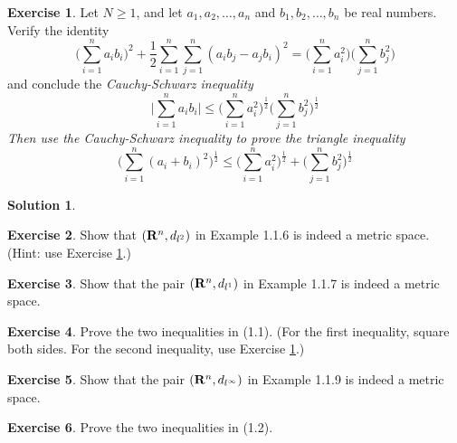 \documentclass[13pt,a4paper]{report}
\theoremstyle{definition}
\newtheorem{exercise}{Exercise}[section]
\newtheorem{solution}{Solution}[section]
\begin{document}
\begin{exercise}\label{exercise_1_1_5}
Let $N \ge 1$, and let $a_1, a_2, \ldots, a_n$ and $b_1, b_2, \ldots, b_n$ be real numbers. Verify
the identity
    \begin{equation*}
    \Bigg(\sum_{i = 1}^n a_i b_i\Bigg)^2 + \frac{1}{2} \sum_{i = 1}^n \sum_{j = 1}^n
    (a_i b_j - a_j b_i)^2 = \Bigg(\sum_{i = 1}^n a_i^2 \Bigg) \Bigg(\sum_{j = 1}^n b_j^2 \Bigg)
    \end{equation*}
and conclude the \it{Cauchy-Schwarz inequality}
    \begin{equation*}
    \Bigg|\sum_{i = 1}^n a_i b_i \Bigg| \le \Bigg(\sum_{i = 1}^n a_i^2\Bigg)^{\frac{1}{2}}
    \Bigg(\sum_{j = 1}^n b_j^2\Bigg)^{\frac{1}{2}}
    \tag{(1.3)}
    \end{equation*}
Then use the Cauchy-Schwarz inequality to prove the \it{triangle inequality}
    \begin{equation*}
    \Bigg(\sum_{i = 1}^n (a_i + b_i)^2\Bigg)^{\frac{1}{2}} \le
    \Bigg(\sum_{i = 1}^n a_i^2\Bigg)^{\frac{1}{2}} +
    \Bigg(\sum_{j = 1}^n b_j^2\Bigg)^{\frac{1}{2}}
    \end{equation*}
\end{exercise}

\begin{solution}
\end{solution}

\begin{exercise}
Show that $({\bf R}^n, d_{l^2})$ in Example 1.1.6 is indeed a metric space. (Hint: use Exercise
\ref{exercise_1_1_5}.)
\end{exercise}

\begin{exercise}
Show that the pair $({\bf R}^n, d_{l^1})$ in Example 1.1.7 is indeed a metric space.
\end{exercise}

\begin{exercise}
Prove the two inequalities in (1.1). (For the first inequality, square both sides. For the second
inequality, use Exercise \ref{exercise_1_1_5}.)
\end{exercise}

\begin{exercise}
Show that the pair $({\bf R}^n, d_{l^\infty})$ in Example 1.1.9 is indeed a metric space.
\end{exercise}

\begin{exercise}
Prove the two inequalities in (1.2).
\end{exercise}
\end{document}
